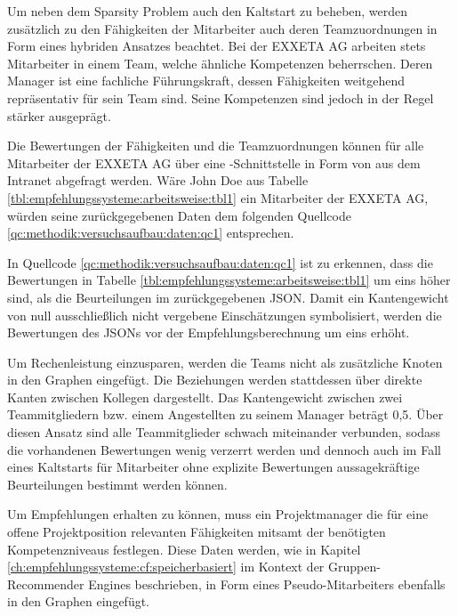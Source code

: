 Um neben dem Sparsity Problem auch den Kaltstart zu beheben, werden zusätzlich zu den Fähigkeiten der Mitarbeiter auch deren Teamzuordnungen in Form eines hybriden Ansatzes beachtet. Bei der EXXETA AG arbeiten stets Mitarbeiter in einem Team, welche ähnliche Kompetenzen beherrschen. Deren Manager ist eine fachliche Führungskraft, dessen Fähigkeiten weitgehend repräsentativ für sein Team sind. Seine Kompetenzen sind jedoch in der Regel stärker ausgeprägt.

Die Bewertungen der Fähigkeiten und die Teamzuordnungen können für alle Mitarbeiter der EXXETA AG über eine -Schnittstelle in Form von  aus dem Intranet abgefragt werden. Wäre John Doe aus Tabelle \ref{tbl:empfehlungssysteme:arbeitsweise:tbl1} ein Mitarbeiter der EXXETA AG, würden seine zurückgegebenen Daten dem folgenden Quellcode \ref{qc:methodik:versuchsaufbau:daten:qc1} entsprechen.



In Quellcode \ref{qc:methodik:versuchsaufbau:daten:qc1} ist zu erkennen, dass die Bewertungen in Tabelle \ref{tbl:empfehlungssysteme:arbeitsweise:tbl1} um eins höher sind, als die Beurteilungen im zurückgegebenen \ac{JSON}. Damit ein Kantengewicht von null ausschließlich nicht vergebene Einschätzungen symbolisiert, werden die Bewertungen des \acp{JSON} vor der Empfehlungsberechnung um eins erhöht.

Um Rechenleistung einzusparen, werden die Teams nicht als zusätzliche Knoten in den Graphen eingefügt. Die Beziehungen werden stattdessen über direkte Kanten zwischen Kollegen dargestellt. Das Kantengewicht zwischen zwei Teammitgliedern bzw. einem Angestellten zu seinem Manager beträgt 0,5. Über diesen Ansatz sind alle Teammitglieder schwach miteinander verbunden, sodass die vorhandenen Bewertungen wenig verzerrt werden und dennoch auch im Fall eines Kaltstarts für Mitarbeiter ohne explizite Bewertungen aussagekräftige Beurteilungen bestimmt werden können.

Um Empfehlungen erhalten zu können, muss ein Projektmanager die für eine offene Projektposition relevanten Fähigkeiten mitsamt der benötigten Kompetenzniveaus festlegen. Diese Daten werden, wie in Kapitel \ref{ch:empfehlungssysteme:cf:speicherbasiert} im Kontext der Gruppen-Recommender Engines beschrieben, in Form eines Pseudo-Mitarbeiters ebenfalls in den Graphen eingefügt.

